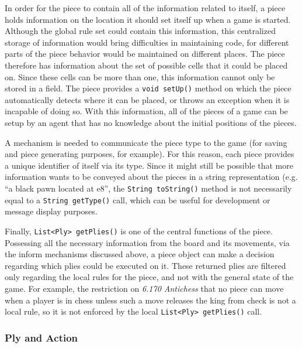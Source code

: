 	 											In order for the piece to contain all of the information related to itself, 
	 											a piece holds information on the location it should set itself up when a game is
	 											started. Although the global rule set could contain this information, this 
	 											centralized storage of information would bring difficulties in maintaining code, 
	 											for different parts of the piece behavior would be maintained on different places.
	 											The piece therefore has information about the set of possible cells that it could 
	 											be placed on. Since these cells can be more than one, this information cannot only be
	 											stored in a field. The piece provides a \texttt{void setUp()} method on which
	 											the piece automatically detects where it can be placed, or throws an exception when
	 											it is incapable of doing so. With this information, all of the pieces of a game 
	 											can be setup by an agent that has no knowledge about the initial positions of the
	 											pieces. 
	
												A mechanism is needed to communicate the piece type to the game (for saving and piece
												generating purposes, for example). For this reason, each piece provides
												a unique identifier of itself via its type. Since it might still be possible that more
												information wants to be conveyed about the pieces in a string representation (e.g.
												``a black pawn located at e8'', the \texttt{String toString()} method is not 
												necessarily equal to a \texttt{String getType()} call, which can be useful 
												for development or message display purposes. 
												
												Finally, \texttt{List<Ply> getPlies()} is one of the central functions of the piece.
												Possessing all the necessary information from the board and its movements, via the
												inform mechanisms discussed above, a piece object can make a decision 
												regarding which plies could be executed on it. These returned plies are filtered only 
												regarding the local rules for the piece, and not with the general state of the game.
												For example, the restriction on  \emph{ 6.170 Antichess} that no piece can move when 
												a player is in chess unless such a move releases the king from check is not a local rule,
												so it is not enforced by the local \texttt{List<Ply> getPlies()} call. 
	 												 											
			\subsubsection{Ply and Action}\label{PlyAction}
